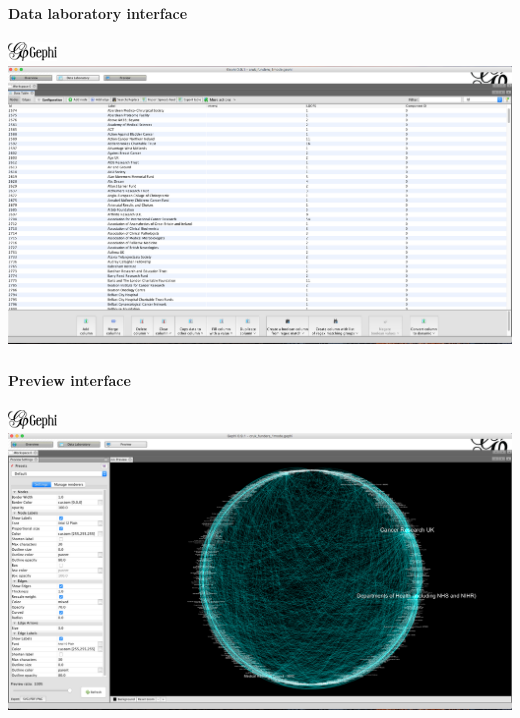 \documentclass[8pt]{beamer}
\begin{document}

\begin{frame}
\frametitle{\insertsection}
\framesubtitle{Data laboratory interface}

\includegraphics[height=0.5cm]{gephi_logo}\\
\includegraphics[width=\linewidth, frame]{gephi_interface2}

\end{frame}


\begin{frame}
\frametitle{\insertsection}
\framesubtitle{Preview interface}

\includegraphics[height=0.5cm]{gephi_logo}\\
\includegraphics[width=\linewidth, frame]{gephi_interface3}

\end{frame}
\end{document}
